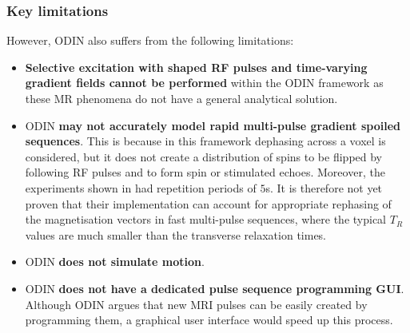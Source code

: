 \subsubsection{Key limitations}
However, ODIN also suffers from the following limitations:
\begin{itemize}
    
    
    
    \item \textbf{Selective excitation with shaped RF pulses and time-varying gradient fields cannot be performed} within the ODIN framework as these MR phenomena do not have a general analytical solution.
    
    \item ODIN \textbf{may not accurately model rapid multi-pulse gradient spoiled sequences}.
    This is because in this framework dephasing across a voxel is considered, but it does not create a distribution of spins to be flipped by following RF pulses and to form spin or stimulated echoes.
    Moreover, the experiments shown in \cite{Jochimsen2006} had repetition periods of $5$s.
    It is therefore not yet proven that their implementation can account for appropriate rephasing of the magnetisation vectors in fast multi-pulse sequences, where the typical $T_R$ values are much smaller than the transverse relaxation times.
    
    \item ODIN \textbf{does not simulate motion}.
    
    \item ODIN \textbf{does not have a dedicated pulse sequence programming GUI}. Although ODIN argues that new MRI pulses can be easily created by programming them, a graphical user interface would speed up this process.
    
\end{itemize}

